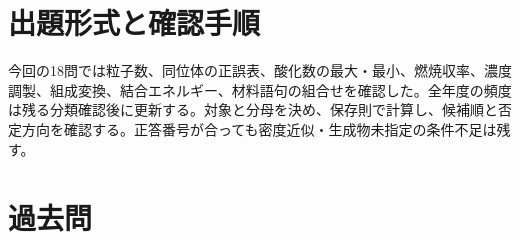 \section{出題形式と確認手順}
今回の18問では粒子数、同位体の正誤表、酸化数の最大・最小、燃焼収率、濃度調製、組成変換、結合エネルギー、材料語句の組合せを確認した。全年度の頻度は残る分類確認後に更新する。対象と分母を決め、保存則で計算し、候補順と否定方向を確認する。正答番号が合っても密度近似・生成物未指定の条件不足は残す。

\section{過去問}




